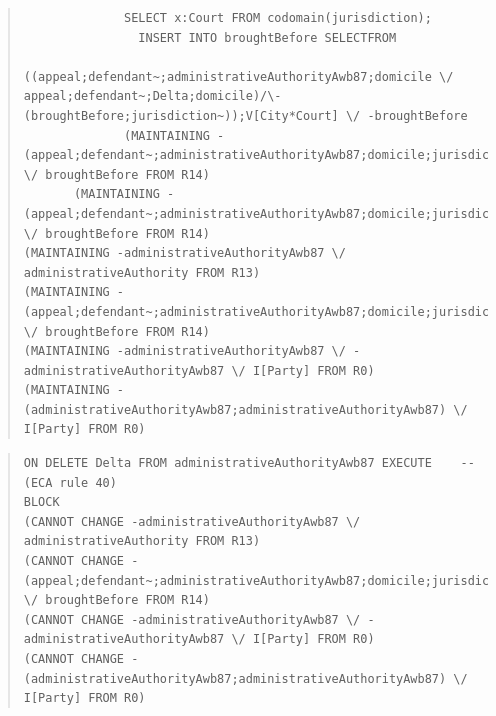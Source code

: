 \documentclass[10pt,a4paper]{report}              %
\theoremstyle{plain}\theorembodyfont{\rmfamily}\newtheorem{definition}{Definition}[section]
\theoremstyle{plain}\theorembodyfont{\rmfamily}\newtheorem{designrule}[definition]{Requirement}
\begin{document}
\begin{quote}
\begin{verbatim}
              SELECT x:Court FROM codomain(jurisdiction);
                INSERT INTO broughtBefore SELECTFROM
                  ((appeal;defendant~;administrativeAuthorityAwb87;domicile \/ appeal;defendant~;Delta;domicile)/\-(broughtBefore;jurisdiction~));V[City*Court] \/ -broughtBefore
              (MAINTAINING -(appeal;defendant~;administrativeAuthorityAwb87;domicile;jurisdiction) \/ broughtBefore FROM R14)
       (MAINTAINING -(appeal;defendant~;administrativeAuthorityAwb87;domicile;jurisdiction) \/ broughtBefore FROM R14)
(MAINTAINING -administrativeAuthorityAwb87 \/ administrativeAuthority FROM R13)
(MAINTAINING -(appeal;defendant~;administrativeAuthorityAwb87;domicile;jurisdiction) \/ broughtBefore FROM R14)
(MAINTAINING -administrativeAuthorityAwb87 \/ -administrativeAuthorityAwb87 \/ I[Party] FROM R0)
(MAINTAINING -(administrativeAuthorityAwb87;administrativeAuthorityAwb87) \/ I[Party] FROM R0)
\end{verbatim}
\end{quote}
\begin{quote}
\begin{verbatim}
ON DELETE Delta FROM administrativeAuthorityAwb87 EXECUTE    -- (ECA rule 40)
BLOCK
(CANNOT CHANGE -administrativeAuthorityAwb87 \/ administrativeAuthority FROM R13)
(CANNOT CHANGE -(appeal;defendant~;administrativeAuthorityAwb87;domicile;jurisdiction) \/ broughtBefore FROM R14)
(CANNOT CHANGE -administrativeAuthorityAwb87 \/ -administrativeAuthorityAwb87 \/ I[Party] FROM R0)
(CANNOT CHANGE -(administrativeAuthorityAwb87;administrativeAuthorityAwb87) \/ I[Party] FROM R0)
\end{verbatim}
\end{quote}
\end{document}
